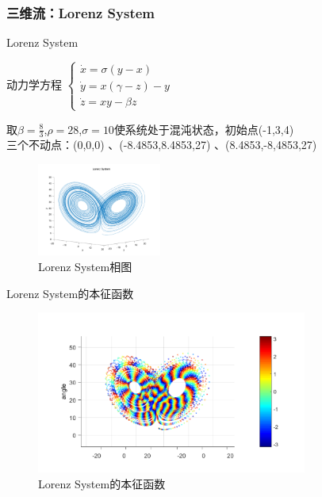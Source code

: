 \documentclass{beamer}
\begin{document}
	\subsubsection{三维流：Lorenz System}
		\begin{frame}{Lorenz System}
		\begin{block}{动力学方程}
			\centering
			\begin{math}
			\begin{cases}
			\dot{x}=\sigma (y-x)\\
			\dot{y}=x(\gamma-z)-y\\
			\dot{z}=xy-\beta z
			\end{cases}\
			\end{math}
		\end{block}
		取$\beta=\frac{8}{3}$,$\rho=28$,$\sigma=10$使系统处于混沌状态，初始点(-1,3,4)\\
		三个不动点：(0,0,0)
、(-8.4853,8.4853,27)
、(8.4853,-8,4853,27)
		\begin{figure}
			\begin{minipage}{0.4\linewidth}
				\centering
				\includegraphics[width=1.6in]{figure/lorenz_phase}
				\caption{Lorenz System相图}
			\end{minipage}
		\end{figure}
		\end{frame}
	
		\begin{frame}{Lorenz System的本征函数}
			\begin{figure}
				\centering
				\includegraphics[width=3.5in]{figure/lorenz_eigen}
				\caption{Lorenz System的本征函数}
			\end{figure}
		\end{frame}
		
\end{document}
